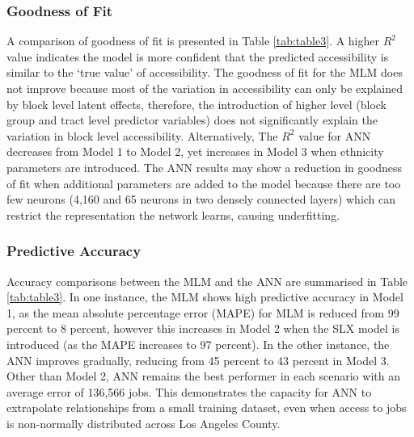 \documentclass[a4paper,UKenglish]{lipics-v2018}
\begin{document}
\subsubsection{Goodness of Fit}
A comparison of goodness of fit is presented in Table \ref{tab:table3}. A higher $R^2$ value indicates the model is more confident that the predicted accessibility is similar to the ‘true value’ of accessibility. The goodness of fit for the MLM does not improve because most of the variation in accessibility can only be explained by block level latent effects, therefore, the introduction of higher level (block group and tract level predictor variables) does not significantly explain the variation in block level accessibility. Alternatively, The $R^2$ value for ANN decreases from Model 1 to Model 2, yet increases in Model 3 when ethnicity parameters are introduced. The ANN results may show a reduction in goodness of fit when additional parameters are added to the model because there are too few neurons (4,160 and 65 neurons in two densely connected layers) which can restrict the representation the network learns, causing underfitting. 

\subsubsection{Predictive Accuracy}
Accuracy comparisons between the MLM and the ANN are summarised in Table \ref{tab:table3}. In one instance, the MLM shows high predictive accuracy in Model 1, as the mean absolute percentage error (MAPE) for MLM is reduced from 99 percent to 8 percent, however this increases in Model 2 when the SLX model is introduced (as the MAPE increases to 97 percent). In the other instance, the ANN improves gradually, reducing from 45 percent to 43 percent in Model 3. Other than Model 2, ANN remains the best performer in each scenario with an average error of 136,566 jobs. This demonstrates the capacity for ANN to extrapolate relationships from a small training dataset, even when access to jobs is non-normally distributed across Los Angeles County.
\end{document}
